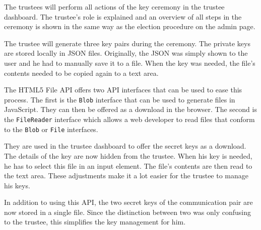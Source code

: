 The trustees will perform all actions of the key ceremony in the trustee dashboard. The trustee's role is explained and an overview of all steps in the ceremony is shown in the same way as the election procedure on the admin page.

\par The trustee will generate three key pairs during the ceremony. The private keys are stored locally in JSON files. Originally, the JSON was simply shown to the user and he had to manually save it to a file. When the key was needed, the file's contents needed to be copied again to a text area.

\par The HTML5 File API offers two API interfaces that can be used to ease this process.\cite{ranganathan_sicking_file_api} The first is the \texttt{Blob} interface that can be used to generate files in JavaScript. They can then be offered as a download in the browser. The second is the \texttt{FileReader} interface which allows a web developer to read files that conform to the \texttt{Blob} or \texttt{File} interfaces.

\par They are used in the trustee dashboard to offer the secret keys as a download. The details of the key are now hidden from the trustee. When his key is needed, he has to select this file in an input element. The file's contents are then read to the text area. These adjustments make it a lot easier for the trustee to manage his keys.

\par In addition to using this API, the two secret keys of the communication pair are now stored in a single file. Since the distinction between two was only confusing to the trustee, this simplifies the key management for him.
